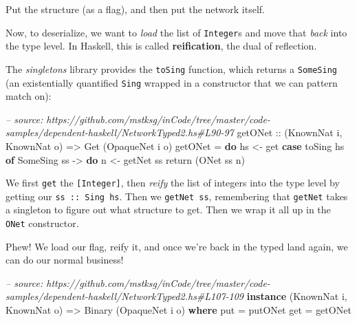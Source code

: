 \documentclass[]{article}
\newenvironment{Shaded}{}{}
\newcommand{\KeywordTok}[1]{\textcolor[rgb]{0.00,0.44,0.13}{\textbf{{#1}}}}
\newcommand{\DataTypeTok}[1]{\textcolor[rgb]{0.56,0.13,0.00}{{#1}}}
\newcommand{\CommentTok}[1]{\textcolor[rgb]{0.38,0.63,0.69}{\textit{{#1}}}}
\newcommand{\OtherTok}[1]{\textcolor[rgb]{0.00,0.44,0.13}{{#1}}}
\newcommand{\FunctionTok}[1]{\textcolor[rgb]{0.02,0.16,0.49}{{#1}}}
\newcommand{\NormalTok}[1]{{#1}}
\begin{document}
Put the structure (as a flag), and then put the network itself.

Now, to deserialize, we want to \emph{load} the list of \texttt{Integer}s and
move that \emph{back} into the type level. In Haskell, this is called
\textbf{reification}, the dual of reflection.

The \emph{singletons} library provides the \texttt{toSing} function, which
returns a \texttt{SomeSing} (an existentially quantified \texttt{Sing} wrapped
in a constructor that we can pattern match on):

\begin{Shaded}
\begin{Highlighting}[]
\CommentTok{-- source: https://github.com/mstksg/inCode/tree/master/code-samples/dependent-haskell/NetworkTyped2.hs#L90-97}
\OtherTok{getONet ::} \NormalTok{(}\DataTypeTok{KnownNat} \NormalTok{i, }\DataTypeTok{KnownNat} \NormalTok{o)}
        \OtherTok{=>} \DataTypeTok{Get} \NormalTok{(}\DataTypeTok{OpaqueNet} \NormalTok{i o)}
\NormalTok{getONet }\FunctionTok{=} \KeywordTok{do}
    \NormalTok{hs }\OtherTok{<-} \NormalTok{get}
    \KeywordTok{case} \NormalTok{toSing hs }\KeywordTok{of}
      \DataTypeTok{SomeSing} \NormalTok{ss }\OtherTok{->} \KeywordTok{do}
        \NormalTok{n }\OtherTok{<-} \NormalTok{getNet ss}
        \NormalTok{return (}\DataTypeTok{ONet} \NormalTok{ss n)}
\end{Highlighting}
\end{Shaded}

We first \texttt{get} the \texttt{{[}Integer{]}}, then \emph{reify} the list of
integers into the type level by getting our \texttt{ss\ ::\ Sing\ hs}. Then we
\texttt{getNet\ ss}, remembering that \texttt{getNet} takes a singleton to
figure out what structure to get. Then we wrap it all up in the \texttt{ONet}
constructor.

Phew! We load our flag, reify it, and once we're back in the typed land again,
we can do our normal business!

\begin{Shaded}
\begin{Highlighting}[]
\CommentTok{-- source: https://github.com/mstksg/inCode/tree/master/code-samples/dependent-haskell/NetworkTyped2.hs#L107-109}
\KeywordTok{instance} \NormalTok{(}\DataTypeTok{KnownNat} \NormalTok{i, }\DataTypeTok{KnownNat} \NormalTok{o) }\OtherTok{=>} \DataTypeTok{Binary} \NormalTok{(}\DataTypeTok{OpaqueNet} \NormalTok{i o) }\KeywordTok{where}
    \NormalTok{put }\FunctionTok{=} \NormalTok{putONet}
    \NormalTok{get }\FunctionTok{=} \NormalTok{getONet}
\end{Highlighting}
\end{Shaded}
\end{document}
